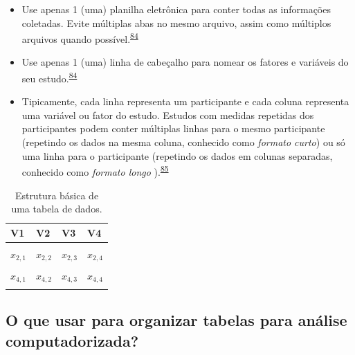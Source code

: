 \documentclass[
  a4paper,
]{book}
\begin{document}
\begin{itemize}
\item
  Use apenas 1 (uma) planilha eletrônica para conter todas as informações coletadas. Evite múltiplas abas no mesmo arquivo, assim como múltiplos arquivos quando possível.\textsuperscript{\protect\hyperlink{ref-broman2018}{84}}
\item
  Use apenas 1 (uma) linha de cabeçalho para nomear os fatores e variáveis do seu estudo.\textsuperscript{\protect\hyperlink{ref-broman2018}{84}}
\item
  Tipicamente, cada linha representa um participante e cada coluna representa uma variável ou fator do estudo. Estudos com medidas repetidas dos participantes podem conter múltiplas linhas para o mesmo participante (repetindo os dados na mesma coluna, conhecido como \emph{formato curto}) ou só uma linha para o participante (repetindo os dados em colunas separadas, conhecido como \emph{formato longo} ).\textsuperscript{\protect\hyperlink{ref-Juluru2015}{85}}
\end{itemize}

\begin{table}

\caption{\label{tab:tabela-0}Estrutura básica de uma tabela de dados.}
\centering
\begin{tabu} to 
\toprule
\textbf{V1} & \textbf{V2} & \textbf{V3} & \textbf{V4}\\
\midrule
{} &  &  & \\
$x_{2,1}$ & $x_{2,2}$ & $x_{2,3}$ & $x_{2,4}$\\
 &  &  & \\
$x_{4,1}$ & $x_{4,2}$ & $x_{4,3}$ & $x_{4,4}$\\
 &  &  & \\
\bottomrule
\end{tabu}
\end{table}

\hypertarget{o-que-usar-para-organizar-tabelas-para-anuxe1lise-computadorizada}{%
\subsection{O que usar para organizar tabelas para análise computadorizada?}\label{o-que-usar-para-organizar-tabelas-para-anuxe1lise-computadorizada}}
\end{document}
